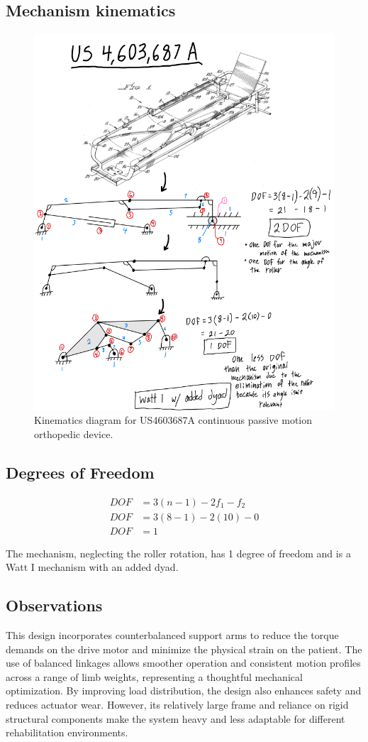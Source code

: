 \documentclass[11pt]{article}
\begin{document}
\subsection{Mechanism kinematics}
\begin{figure}[H]
  \centering
  \includegraphics[width=0.54\linewidth]{../Kinematic Mechanism Images/4603687.png}
  \caption{Kinematics diagram for US4603687A continuous passive motion orthopedic device.}
  \label{fig:US4603687A_kinematics}
\end{figure}

\subsection{Degrees of Freedom}
\[
\begin{aligned}
DOF &= 3(n-1) - 2f_1 - f_2 \\
DOF &= 3(8-1) - 2(10) - 0 \\
DOF &= 1
\end{aligned}
\]

The mechanism, neglecting the roller rotation, has 1 degree of freedom and is a Watt I mechanism with an added dyad.

\subsection{Observations}
This design incorporates counterbalanced support arms to reduce the torque demands on the drive motor and minimize the physical strain on the patient. The use of balanced linkages allows smoother operation and consistent motion profiles across a range of limb weights, representing a thoughtful mechanical optimization. By improving load distribution, the design also enhances safety and reduces actuator wear. However, its relatively large frame and reliance on rigid structural components make the system heavy and less adaptable for different rehabilitation environments.
\end{document}
